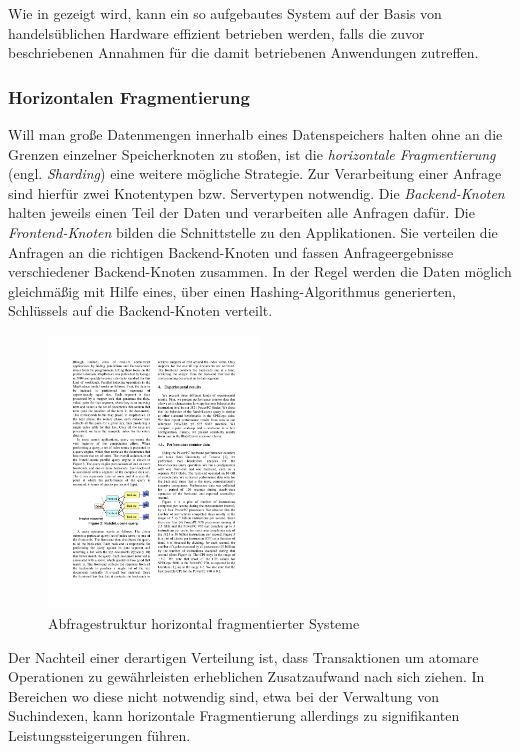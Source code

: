 Wie in  \citep{ghemawat03}  gezeigt wird, kann ein so aufgebautes System auf der Basis von handelsüblichen Hardware effizient betrieben werden, falls die zuvor beschriebenen Annahmen für die damit betriebenen Anwendungen zutreffen.  \citep{ghemawat03}

\subsubsection{Horizontalen Fragmentierung}\label{sec:sharding}

Will man große Datenmengen innerhalb eines Datenspeichers halten ohne an die Grenzen einzelner Speicherknoten zu stoßen, ist die \textit{horizontale Fragmentierung} (engl. \textit{Sharding}) eine weitere mögliche Strategie. Zur Verarbeitung einer Anfrage sind hierfür zwei Knotentypen bzw. Servertypen notwendig. Die \textit{Backend-Knoten} halten jeweils einen Teil der Daten und verarbeiten alle Anfragen dafür. Die \textit{Frontend-Knoten} bilden die Schnittstelle zu den Applikationen. Sie verteilen die Anfragen an die richtigen Backend-Knoten und fassen Anfrageergebnisse verschiedener Backend-Knoten zusammen. In der Regel werden die Daten möglich gleichmäßig mit Hilfe eines, über einen Hashing-Algorithmus generierten, Schlüssels auf die Backend-Knoten verteilt. \citep{Michael07}
\begin{figure}[H]
  \centering
    \includegraphics[width=0.5\textwidth]{Abbildungen/sharding}
    \caption[Horizonale Fragmentierung]{\footnotesize Abfragestruktur horizontal fragmentierter Systeme {\footnotemark} }
    \label{fig:sharding}
\end{figure}

Der Nachteil einer derartigen Verteilung ist, dass Transaktionen um atomare Operationen zu gewährleisten erheblichen Zusatzaufwand nach sich ziehen. In Bereichen wo diese nicht notwendig sind, etwa bei der Verwaltung von Suchindexen, kann horizontale Fragmentierung allerdings zu signifikanten Leistungssteigerungen führen. \citep{Michael07}

